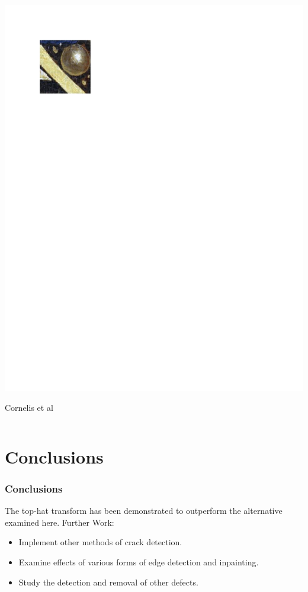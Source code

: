 \documentclass{beamer}
\begin{document}
\begin{frame}
\begin{columns}
\begin{column}{0.5\textwidth}
\includegraphics[width=1\textwidth,trim={0.5in 8.4in 5.5in 0.75in},clip]{ghent_altarpiece_restored}
\begin{center}
{\tiny Cornelis et al}
\end{center}
\end{column}
\end{columns}
\end{frame}

\section[Conclusions]{Conclusions}

\begin{frame}
\frametitle[Conclusions]{Conclusions}
The top-hat transform has been demonstrated to outperform the alternative examined here.
\linebreak
\linebreak
\linebreak
Further Work:
\begin{itemize}
\item Implement other methods of crack detection.
\item Examine effects of various forms of edge detection and inpainting.
\item Study the detection and removal of other defects.
\end{itemize}
\end{frame}
\end{document}
